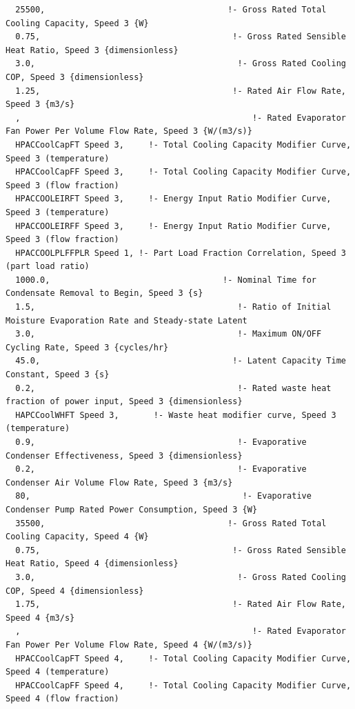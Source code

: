 \begin{lstlisting}
  25500,                                     !- Gross Rated Total Cooling Capacity, Speed 3 {W}
  0.75,                                       !- Gross Rated Sensible Heat Ratio, Speed 3 {dimensionless}
  3.0,                                         !- Gross Rated Cooling COP, Speed 3 {dimensionless}
  1.25,                                       !- Rated Air Flow Rate, Speed 3 {m3/s}
  ,                                               !- Rated Evaporator Fan Power Per Volume Flow Rate, Speed 3 {W/(m3/s)}
  HPACCoolCapFT Speed 3,     !- Total Cooling Capacity Modifier Curve, Speed 3 (temperature)
  HPACCoolCapFF Speed 3,     !- Total Cooling Capacity Modifier Curve, Speed 3 (flow fraction)
  HPACCOOLEIRFT Speed 3,     !- Energy Input Ratio Modifier Curve, Speed 3 (temperature)
  HPACCOOLEIRFF Speed 3,     !- Energy Input Ratio Modifier Curve, Speed 3 (flow fraction)
  HPACCOOLPLFFPLR Speed 1, !- Part Load Fraction Correlation, Speed 3 (part load ratio)
  1000.0,                                   !- Nominal Time for Condensate Removal to Begin, Speed 3 {s}
  1.5,                                         !- Ratio of Initial Moisture Evaporation Rate and Steady-state Latent
  3.0,                                         !- Maximum ON/OFF Cycling Rate, Speed 3 {cycles/hr}
  45.0,                                       !- Latent Capacity Time Constant, Speed 3 {s}
  0.2,                                         !- Rated waste heat fraction of power input, Speed 3 {dimensionless}
  HAPCCoolWHFT Speed 3,       !- Waste heat modifier curve, Speed 3 (temperature)
  0.9,                                         !- Evaporative Condenser Effectiveness, Speed 3 {dimensionless}
  0.2,                                         !- Evaporative Condenser Air Volume Flow Rate, Speed 3 {m3/s}
  80,                                           !- Evaporative Condenser Pump Rated Power Consumption, Speed 3 {W}
  35500,                                     !- Gross Rated Total Cooling Capacity, Speed 4 {W}
  0.75,                                       !- Gross Rated Sensible Heat Ratio, Speed 4 {dimensionless}
  3.0,                                         !- Gross Rated Cooling COP, Speed 4 {dimensionless}
  1.75,                                       !- Rated Air Flow Rate, Speed 4 {m3/s}
  ,                                               !- Rated Evaporator Fan Power Per Volume Flow Rate, Speed 4 {W/(m3/s)}
  HPACCoolCapFT Speed 4,     !- Total Cooling Capacity Modifier Curve, Speed 4 (temperature)
  HPACCoolCapFF Speed 4,     !- Total Cooling Capacity Modifier Curve, Speed 4 (flow fraction)

\end{lstlisting}
